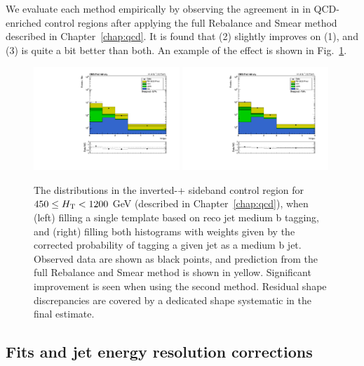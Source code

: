 We evaluate each method empirically by observing the agreement in \nbtags in QCD-enriched control regions after applying
the full Rebalance and Smear method described in Chapter~\ref{chap:qcd}. It is found that (2) slightly improves on (1), and (3) is quite a bit better than both.
An example of the effect is shown in Fig.~\ref{fig:jrt_nb}.

\begin{figure}[htbp]
  \begin{center}
    \includegraphics[width=0.49\textwidth]{figs/jetmet/nBJet20_DPhiMT2InclusiveHT450to1200_RecoBJet.pdf}
    \includegraphics[width=0.49\textwidth]{figs/jetmet/nBJet20_DPhiMT2InclusiveHT450to1200_BTagSFs.pdf}
    \caption{The \nbtags distributions in the inverted-\dpmin + \mttwo sideband control region for $450 \leq H_{\mathrm{T}} < 1200$ GeV
    (described in Chapter~\ref{chap:qcd}),
    when (left) filling a single template based on reco jet medium b tagging, and (right) filling both histograms with
    weights given by the corrected probability of tagging a given jet as a medium b jet. Observed data are shown
    as black points, and prediction from the full Rebalance and Smear method is shown in yellow.
    Significant improvement is seen when using the second method. Residual shape discrepancies are 
    covered by a dedicated \nbtags shape systematic in the final estimate.
    }
    \label{fig:jrt_nb}
  \end{center}
\end{figure}


\subsection{Fits and jet energy resolution corrections}
\label{sec:jrt_fits}

